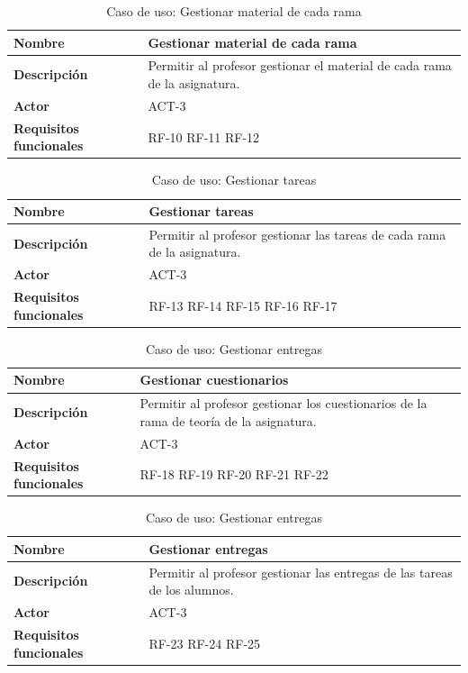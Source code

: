 \begin{table}[H]
\centering
\begin{tabularx}{\textwidth}{
  |>{\centering\arraybackslash}l
  |>{\centering\arraybackslash}X|}
\hline
\textbf{Nombre} & {\textbf{Gestionar material de cada rama}} \\ \hline

\textbf{Descripción} & Permitir al profesor gestionar el material de cada rama de la asignatura. \\ \hline
\textbf{Actor} & ACT-3\\ \hline
\textbf{Requisitos funcionales} & RF-10 RF-11 RF-12 \\ \hline
\end{tabularx}
\caption{Caso de uso: Gestionar material de cada rama}
\end{table}
\begin{table}[H]
\centering
\begin{tabularx}{\textwidth}{
  |>{\centering\arraybackslash}l
  |>{\centering\arraybackslash}X|}
\hline
\textbf{Nombre} & {\textbf{Gestionar tareas}} \\ \hline

\textbf{Descripción} & Permitir al profesor gestionar las tareas de cada rama de la asignatura. \\ \hline
\textbf{Actor} & ACT-3\\ \hline
\textbf{Requisitos funcionales} & RF-13 RF-14 RF-15 RF-16 RF-17 \\ \hline
\end{tabularx}
\caption{Caso de uso: Gestionar tareas}
\end{table}
\begin{table}[H]
\centering
\begin{tabularx}{\textwidth}{
  |>{\centering\arraybackslash}l
  |>{\centering\arraybackslash}X|}
\hline
\textbf{Nombre} & {\textbf{Gestionar cuestionarios}} \\ \hline

\textbf{Descripción} & Permitir al profesor gestionar los cuestionarios de la rama de teoría de la asignatura. \\ \hline
\textbf{Actor} & ACT-3\\ \hline
\textbf{Requisitos funcionales} & RF-18 RF-19 RF-20 RF-21 RF-22 \\ \hline
\end{tabularx}
\caption{Caso de uso: Gestionar entregas}
\end{table}
\begin{table}[H]
\centering
\begin{tabularx}{\textwidth}{
  |>{\centering\arraybackslash}l
  |>{\centering\arraybackslash}X|}
\hline
\textbf{Nombre} & {\textbf{Gestionar entregas}} \\ \hline

\textbf{Descripción} & Permitir al profesor gestionar las entregas de las tareas de los alumnos. \\ \hline
\textbf{Actor} & ACT-3\\ \hline
\textbf{Requisitos funcionales} & RF-23 RF-24 RF-25\\ \hline
\end{tabularx}
\caption{Caso de uso: Gestionar entregas}
\end{table}
